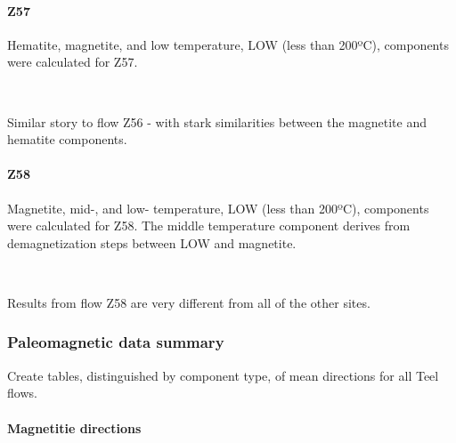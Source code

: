 \documentclass[11pt]{article}
\begin{document}
    \paragraph{Z57}\label{z57}

    Hematite, magnetite, and low temperature, LOW (less than 200ºC),
components were calculated for Z57.



    \begin{center}
    \end{center}
    { \hspace*{\fill} \\}
    
    Similar story to flow Z56 - with stark similarities between the
magnetite and hematite components.

    \paragraph{Z58}\label{z58}

    Magnetite, mid-, and low- temperature, LOW (less than 200ºC), components
were calculated for Z58. The middle temperature component derives from
demagnetization steps between LOW and magnetite.



    \begin{center}
    \end{center}
    { \hspace*{\fill} \\}
    
    Results from flow Z58 are very different from all of the other sites.

    \subsubsection{Paleomagnetic data
summary}\label{paleomagnetic-data-summary}

    Create tables, distinguished by component type, of mean directions for
all Teel flows.

    \paragraph{Magnetitie directions}\label{magnetitie-directions}
\end{document}
